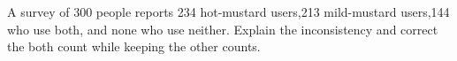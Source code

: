 A survey of 300 people reports 234 hot-mustard users,213 mild-mustard users,144 who use both, and none who use neither. Explain the inconsistency and correct the both count while keeping the other counts.
